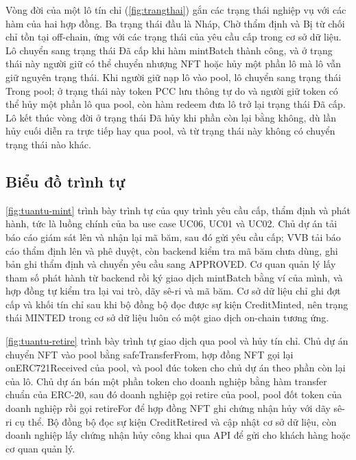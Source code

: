 \HinhLopHopDong

Vòng đời của một lô tín chỉ (\autoref{fig:trangthai}) gắn các trạng thái nghiệp vụ với các hàm của hai hợp đồng. Ba trạng thái đầu là Nháp, Chờ thẩm định và Bị từ chối chỉ tồn tại off-chain, ứng với các trạng thái của yêu cầu cấp trong cơ sở dữ liệu. Lô chuyển sang trạng thái Đã cấp khi hàm mintBatch thành công, và ở trạng thái này người giữ có thể chuyển nhượng NFT hoặc hủy một phần lô mà lô vẫn giữ nguyên trạng thái. Khi người giữ nạp lô vào pool, lô chuyển sang trạng thái Trong pool; ở trạng thái này token PCC lưu thông tự do và người giữ token có thể hủy một phần lô qua pool, còn hàm redeem đưa lô trở lại trạng thái Đã cấp. Lô kết thúc vòng đời ở trạng thái Đã hủy khi phần còn lại bằng không, dù lần hủy cuối diễn ra trực tiếp hay qua pool, và từ trạng thái này không có chuyển trạng thái nào khác.

\HinhTrangThai

\FloatBarrier
\subsection*{Biểu đồ trình tự}
\label{sec:tk-tuantu}

\autoref{fig:tuantu-mint} trình bày trình tự của quy trình yêu cầu cấp, thẩm định và phát hành, tức là luồng chính của ba use case UC06, UC01 và UC02. Chủ dự án tải báo cáo giám sát lên và nhận lại mã băm, sau đó gửi yêu cầu cấp; VVB tải báo cáo thẩm định lên và phê duyệt, còn backend kiểm tra mã băm chưa dùng, ghi bản ghi thẩm định và chuyển yêu cầu sang APPROVED. Cơ quan quản lý lấy tham số phát hành từ backend rồi ký giao dịch mintBatch bằng ví của mình, và hợp đồng tự kiểm tra lại vai trò, dãy sê-ri và mã băm. Cơ sở dữ liệu chỉ ghi đợt cấp và khối tín chỉ sau khi bộ đồng bộ đọc được sự kiện CreditMinted, nên trạng thái MINTED trong cơ sở dữ liệu luôn có một giao dịch on-chain tương ứng.

\HinhTuanTuMint

\autoref{fig:tuantu-retire} trình bày trình tự giao dịch qua pool và hủy tín chỉ. Chủ dự án chuyển NFT vào pool bằng safeTransferFrom, hợp đồng NFT gọi lại onERC721Received của pool, và pool đúc token cho chủ dự án theo phần còn lại của lô. Chủ dự án bán một phần token cho doanh nghiệp bằng hàm transfer chuẩn của ERC-20, sau đó doanh nghiệp gọi retire của pool, pool đốt token của doanh nghiệp rồi gọi retireFor để hợp đồng NFT ghi chứng nhận hủy với dãy sê-ri cụ thể. Bộ đồng bộ đọc sự kiện CreditRetired và cập nhật cơ sở dữ liệu, còn doanh nghiệp lấy chứng nhận hủy công khai qua API để gửi cho khách hàng hoặc cơ quan quản lý.


